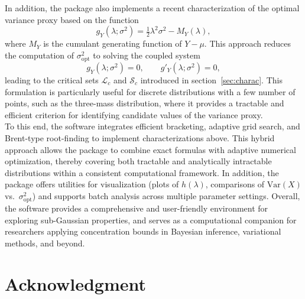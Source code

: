 \documentclass[a4paper, 10pt]{article}
\theoremstyle{definition}
\begin{document}
In addition, the package also implements a recent characterization of the optimal variance proxy based on the function 
\[
g_Y(\lambda;\sigma^2)=\tfrac{1}{2}\lambda^2\sigma^2 - M_Y(\lambda),
\]
where $M_Y$ is the cumulant generating function of $Y-\mu$. 
This approach reduces the computation of $\sigma^2_{\mathrm{opt}}$ to solving the coupled system 
\[
g_Y(\lambda;\sigma^2)=0, \qquad g'_Y(\lambda;\sigma^2)=0,
\]
leading to the critical sets $\mathcal{L}_c$ and $\mathcal{S}_c$ introduced in  section~\ref{sec:charac}. 
This formulation is particularly useful for discrete distributions with a few number of points, such as the three-mass distribution, where it provides a tractable and efficient criterion for identifying candidate values of the variance proxy.\\
To this end, the software integrates efficient bracketing, adaptive grid search, and Brent-type root-finding to implement characterizations above.
This hybrid approach allows the package to combine exact formulas with adaptive numerical optimization, thereby covering both tractable and analytically intractable distributions within a consistent computational framework. 
In addition, the package offers utilities for visualization (plots of $h(\lambda)$, comparisons of $\mathrm{Var}(X)$ vs.\ $\sigma^2_{\text{opt}}$) and supports batch analysis across multiple parameter settings. 
Overall, the software provides a comprehensive and user-friendly environment for exploring sub-Gaussian properties, and serves as a computational companion for researchers applying concentration bounds in Bayesian inference, variational methods, and beyond.
\section*{Acknowledgment}

\newpage
\end{document}
